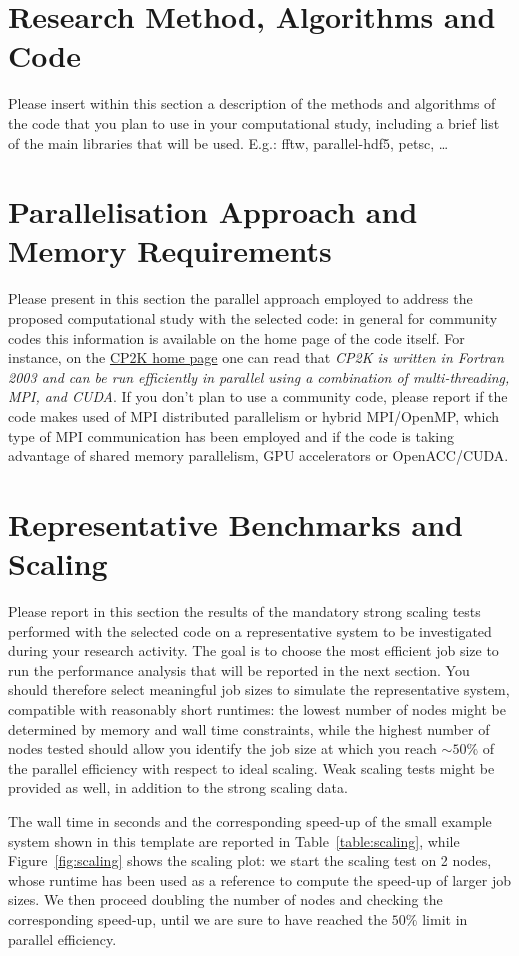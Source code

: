 \documentclass[11pt]{article}
\begin{document}
\section{Research Method, Algorithms and Code}
Please insert within this section a description of the methods and algorithms of the code that you plan to use in your computational study, 
including a brief list of the main libraries that will be used. E.g.: fftw, parallel-hdf5, petsc, \ldots

\section{Parallelisation Approach and Memory Requirements}
Please present in this section the parallel approach employed to address the proposed computational study with the selected code: 
in general for community codes this information is available on the home page of the code itself.
For instance, on the \href{www.cp2k.org}{CP2K home page} one can read that \emph{CP2K is written in Fortran 2003 and can be run 
efficiently in parallel using a combination of multi-threading, MPI, and CUDA}.
If you don't plan to use a community code, please report if the code makes used of MPI distributed parallelism or hybrid MPI/OpenMP, 
which type of MPI communication has been employed and if the code is taking advantage of shared memory parallelism, 
GPU accelerators or OpenACC/CUDA.

\section{Representative Benchmarks and Scaling}
Please report in this section the results of the mandatory strong scaling tests performed with the selected code on a representative system 
to be investigated during your research activity. 
The goal is to choose the most efficient job size to run the performance analysis that will be reported in the next section. 
You should therefore select meaningful job sizes to simulate the representative system, compatible with reasonably short runtimes: 
the lowest number of nodes might be determined by memory and wall time constraints, while the highest number of nodes tested 
should allow you identify the job size at which you reach $\sim 50\%$ of the parallel efficiency with respect to ideal scaling. 
Weak scaling tests might be provided as well, in addition to the strong scaling data. 

The wall time in seconds and the corresponding speed-up of the small example system shown in this template are reported 
in Table~\ref{table:scaling}, while Figure~\ref{fig:scaling} shows the scaling plot: we start the scaling test 
on 2 nodes, whose runtime has been used as a reference to compute the speed-up of larger job sizes. 
We then proceed doubling the number of nodes and checking the corresponding speed-up, until we are sure to have reached the $50\%$ 
limit in parallel efficiency. 
\end{document}
